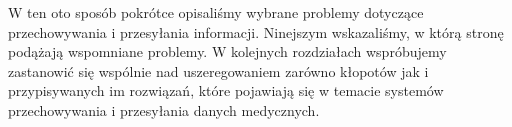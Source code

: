 W ten oto sposób pokrótce opisaliśmy wybrane problemy dotyczące przechowywania i przesyłania informacji. Ninejszym wskazaliśmy, w którą stronę podążają wspomniane problemy. W kolejnych rozdziałach wspróbujemy zastanowić się wspólnie nad uszeregowaniem zarówno kłopotów jak i przypisywanych im rozwiązań, które pojawiają się w temacie systemów przechowywania i przesyłania danych medycznych.